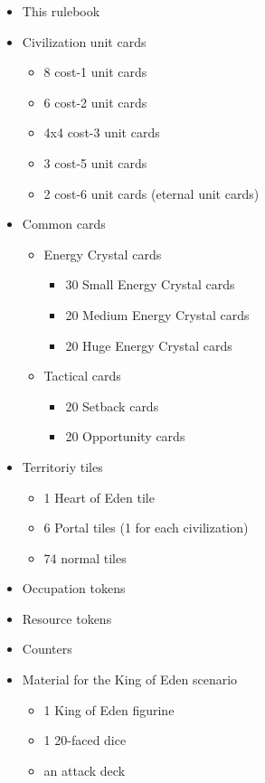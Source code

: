 \documentclass[a4paper]{article}
\begin{document}
    \begin{itemize}
        \item This rulebook
        \item Civilization unit cards
            \begin{itemize}
                \item 8 cost-1 unit cards
                \item 6 cost-2 unit cards
                \item 4x4 cost-3 unit cards
                \item 3 cost-5 unit cards
                \item 2 cost-6 unit cards (eternal unit cards)
            \end{itemize}
        \item Common cards
            \begin{itemize}
                \item Energy Crystal cards
                    \begin{itemize}
                        \item 30 Small Energy Crystal cards
                        \item 20 Medium Energy Crystal cards
                        \item 20 Huge Energy Crystal cards
                    \end{itemize}
                \item Tactical cards
                    \begin{itemize}
                        \item 20 Setback cards
                        \item 20 Opportunity cards
                    \end{itemize}
            \end{itemize}
        \item Territoriy tiles
            \begin{itemize}
                \item 1 Heart of Eden tile
                \item 6 Portal tiles (1 for each civilization)
                \item 74 normal tiles
            \end{itemize}
        \item Occupation tokens
        \item Resource tokens
        \item Counters
        \item Material for the King of Eden scenario
            \begin{itemize}
                \item 1 King of Eden figurine
                \item 1 20-faced dice
                \item an attack deck
            \end{itemize}
    \end{itemize}
\end{document}
